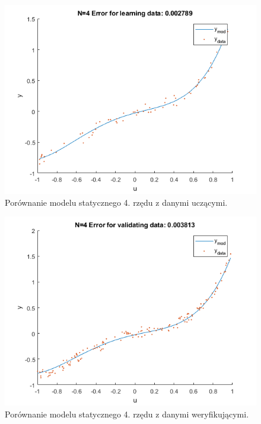 \begin{figure}[H]
\centering
\includegraphics[width=15cm]{images/s7.png}
\caption{Porównanie modelu statycznego 4. rzędu z danymi uczącymi.}
\label{fig:s7}
\end{figure}
\begin{figure}[H]
\centering
\includegraphics[width=15cm]{images/s8.png}
\caption{Porównanie modelu statycznego 4. rzędu z danymi weryfikującymi.}
\label{fig:s8}
\end{figure}
